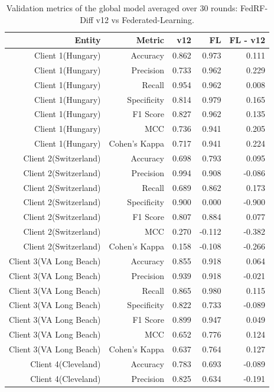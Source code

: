 \begin{table}[t]
\centering
\small
\caption{Validation metrics of the global model averaged over 30 rounds: FedRF-Diff v12 vs Federated-Learning.}
\label{tab:v12_fl_metrics_averaged}
\begin{tabular}{rrrrr}
\toprule
Entity & Metric & v12 & FL & FL - v12 \\
\midrule
Client 1(Hungary) & Accuracy & 0.862 & 0.973 & 0.111 \\
Client 1(Hungary) & Precision & 0.733 & 0.962 & 0.229 \\
Client 1(Hungary) & Recall & 0.954 & 0.962 & 0.008 \\
Client 1(Hungary) & Specificity & 0.814 & 0.979 & 0.165 \\
Client 1(Hungary) & F1 Score & 0.827 & 0.962 & 0.135 \\
Client 1(Hungary) & MCC & 0.736 & 0.941 & 0.205 \\
Client 1(Hungary) & Cohen's Kappa & 0.717 & 0.941 & 0.224 \\
Client 2(Switzerland) & Accuracy & 0.698 & 0.793 & 0.095 \\
Client 2(Switzerland) & Precision & 0.994 & 0.908 & -0.086 \\
Client 2(Switzerland) & Recall & 0.689 & 0.862 & 0.173 \\
Client 2(Switzerland) & Specificity & 0.900 & 0.000 & -0.900 \\
Client 2(Switzerland) & F1 Score & 0.807 & 0.884 & 0.077 \\
Client 2(Switzerland) & MCC & 0.270 & -0.112 & -0.382 \\
Client 2(Switzerland) & Cohen's Kappa & 0.158 & -0.108 & -0.266 \\
Client 3(VA Long Beach) & Accuracy & 0.855 & 0.918 & 0.064 \\
Client 3(VA Long Beach) & Precision & 0.939 & 0.918 & -0.021 \\
Client 3(VA Long Beach) & Recall & 0.865 & 0.980 & 0.115 \\
Client 3(VA Long Beach) & Specificity & 0.822 & 0.733 & -0.089 \\
Client 3(VA Long Beach) & F1 Score & 0.899 & 0.947 & 0.049 \\
Client 3(VA Long Beach) & MCC & 0.652 & 0.776 & 0.124 \\
Client 3(VA Long Beach) & Cohen's Kappa & 0.637 & 0.764 & 0.127 \\
Client 4(Cleveland) & Accuracy & 0.783 & 0.693 & -0.089 \\
Client 4(Cleveland) & Precision & 0.825 & 0.634 & -0.191 \\

\end{tabular}
\end{table}
